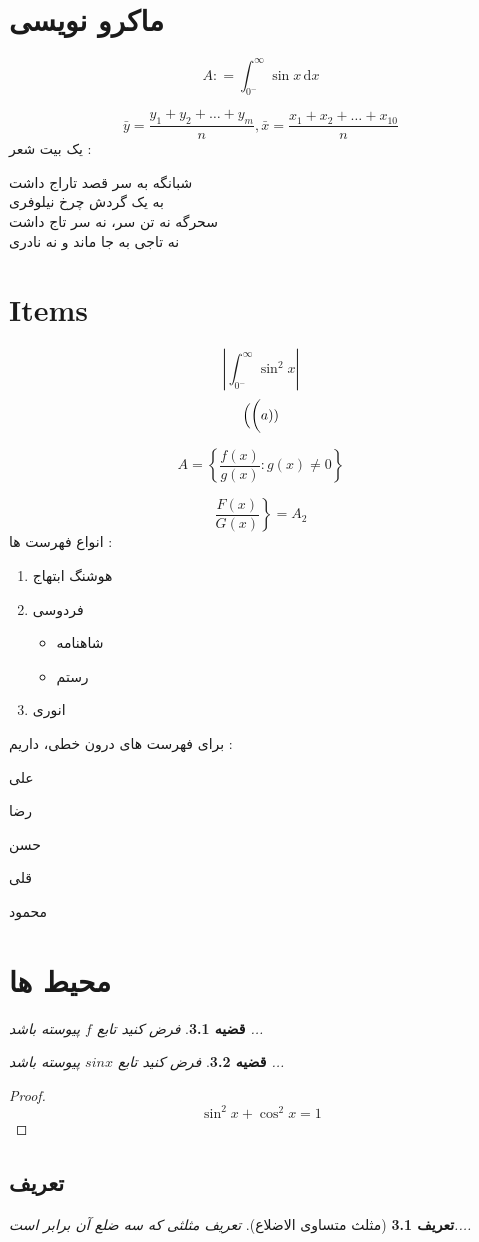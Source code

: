 \documentclass{book}
\newtheorem{thm}{قضیه}
\newtheorem{Def}{تعریف}
\newcommand{\dd}{\, \mathrm{d}}
\newcommand{\mian}[2]{\frac{#1_1 + #1_2 + \dots + #1_{#2}}{n}}
\begin{document}
\chapter{ماکرو نویسی}
\[
A \colon = \int_{0^{-}}^{\infty} \sin x \dd x
\]

\[
\bar{y} = \mian{y}{m}, \bar{x} = \mian{x}{10}
\]
 	یک بیت شعر :
\begin{multicols}{2}
شبانگه به سر قصد تاراج داشت \\ به یک گردش چرخ نیلوفری 
	\\
سحرگه نه تن سر، نه سر تاج داشت \\ نه تاجی به جا ماند و نه نادری
\end{multicols}

\chapter{Items}
\Time
\[
\left\lvert \int_{0^-}^{\infty} \sin^2 x \right\rvert
\]
\[
\Big( \bigg( a)\small)
\]

\[
A = \left\lbrace \frac{f(x)}{g(x)} \colon g(x) \neq 0 \right\rbrace
\]

\[
\left. \frac{F(x)}{G(x)} \right \rbrace = A_2
\]
\BNaz
انواع فهرست ها :
\begin{enumerate}
	\item 
	هوشنگ ابتهاج
	\item 
	فردوسی
	\begin{itemize}
		\item 
		شاهنامه
		\item 
		رستم
	\end{itemize}
		\item 
		انوری
\end{enumerate}

برای فهرست های درون خطی، داریم :
\begin{inparaitem}
	\item 
	علی
	\item 
	رضا
	\begin{inparaitem}
		\item  
		حسن
		\item 
		قلی
	\end{inparaitem}
	\item  
	محمود
\end{inparaitem}

\chapter{محیط ها}
\BNaz
\begin{thm}
	فرض کنید تابع $f$ پیوسته باشد ...
\end{thm}

\begin{thm}
	فرض کنید تابع $sin x$ پیوسته باشد ...
\end{thm}

\begin{proof}
	\[
	\sin ^ 2 x + \cos ^2 x = 1
	\]
\end{proof}

\section{تعریف}
\begin{Def}[مثلث متساوی الاضلاع]
تعریف مثلثی که سه ضلع آن برابر است....
\end{Def}
\end{document}
